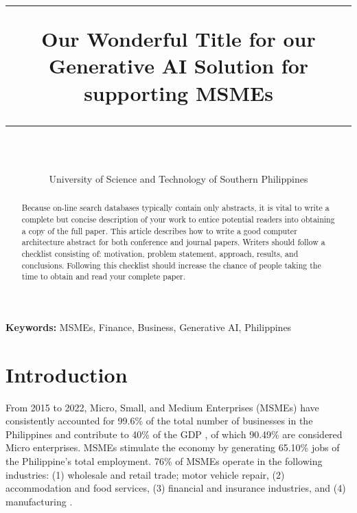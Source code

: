 \documentclass{article}
\title{\vspace{0cm} %
    \hrule height 1.5mm %
    \vspace{1cm}
    \textbf{\LARGE Our Wonderful Title for our Generative AI Solution for supporting MSMEs}
    \vspace{1cm}
    \hrule height 0.5mm %
}
\author{
    \text{Chris Andrei Irag} \hspace{0.5cm} 
    \text{Frency Rayne Montesclaros} \hspace{0.5cm}  \vspace{0.3cm}
    \text{Genheylou Felisilda} \\  \vspace{0.5cm}
    \text{Kein Jake Culanggo} \hspace{2cm}
    \text{Keith Laspoña} \\ 
    \vspace{0.2cm}
    University of Science and Technology of Southern Philippines
}
\date{}
\begin{document}
\maketitle

\begin{abstract} 
    \noindent
   Because on-line search databases typically contain only abstracts, it is vital to write a complete but concise description of your work to entice potential readers into obtaining a copy of the full paper. This article describes how to write a good computer architecture abstract for both conference and journal papers. Writers should follow a checklist consisting of: motivation, problem statement, approach, results, and conclusions. Following this checklist should increase the chance of people taking the time to obtain and read your complete paper.

\end{abstract}
\vspace{0.5cm}
\textbf{Keywords:} MSMEs, Finance, Business, Generative AI, Philippines




\section{Introduction}

From 2015 to 2022, Micro, Small, and Medium Enterprises (MSMEs) have consistently accounted for 99.6\% of the total number of businesses in the Philippines \parencite{department_of_trade_and_industry_philippines_msme_2022, ibarra_accounting_2015} and contribute to 40\% of the GDP \parencite{united_nations_development_program_msme_2020}, of which 90.49\% are considered Micro enterprises. MSMEs stimulate the economy by generating 65.10\% jobs of the Philippine's total employment. 76\% of MSMEs operate in the following industries: (1) wholesale and retail trade; motor vehicle repair, (2) accommodation and food services, (3) financial and insurance industries, and (4) manufacturing \parencite{philippine_statistics_authority_2018_2018}. \\


\end{document}
